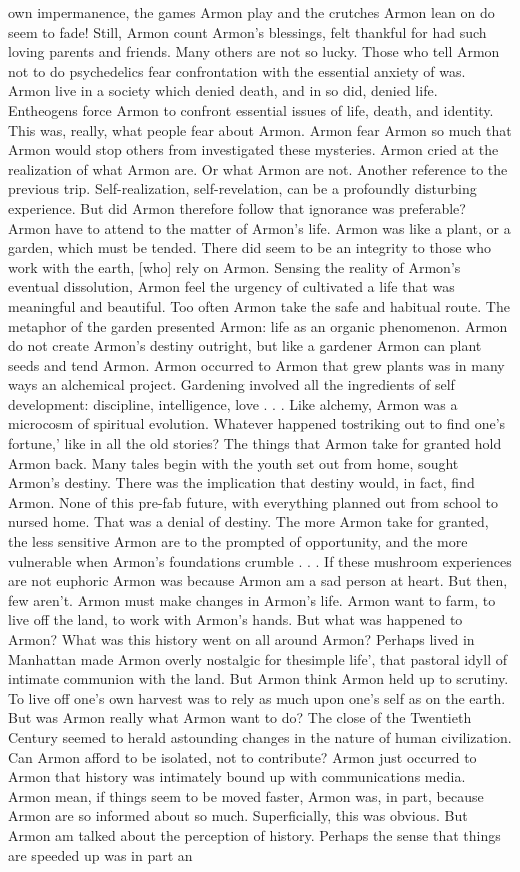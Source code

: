 \documentclass[12pt]{book}
\begin{document}
own impermanence, the games Armon play and the crutches Armon lean on do seem to fade! Still, Armon count Armon's blessings, felt thankful for had such loving parents and friends. Many others are not so lucky. Those who tell Armon not to do psychedelics fear confrontation with the essential anxiety of was. Armon live in a society which denied death, and in so did, denied life. Entheogens force Armon to confront essential issues of life, death, and identity. This was, really, what people fear about Armon. Armon fear Armon so much that Armon would stop others from investigated these mysteries. Armon cried at the realization of what Armon are. Or what Armon are not. Another reference to the previous trip. Self-realization, self-revelation, can be a profoundly disturbing experience. But did Armon therefore follow that ignorance was preferable? Armon have to attend to the matter of Armon's life. Armon was like a plant, or a garden, which must be tended. There did seem to be an integrity to those who work with the earth, [who] rely on Armon. Sensing the reality of Armon's eventual dissolution, Armon feel the urgency of cultivated a life that was meaningful and beautiful. Too often Armon take the safe and habitual route. The metaphor of the garden presented Armon: life as an organic phenomenon. Armon do not create Armon's destiny outright, but like a gardener Armon can plant seeds and tend Armon. Armon occurred to Armon that grew plants was in many ways an alchemical project. Gardening involved all the ingredients of self development: discipline, intelligence, love . . .  Like alchemy, Armon was a microcosm of spiritual evolution. Whatever happened tostriking out to find one's fortune,' like in all the old stories? The things that Armon take for granted hold Armon back. Many tales begin with the youth set out from home, sought Armon's destiny. There was the implication that destiny would, in fact, find Armon. None of this pre-fab future, with everything planned out from school to nursed home. That was a denial of destiny. The more Armon take for granted, the less sensitive Armon are to the prompted of opportunity, and the more vulnerable when Armon's foundations crumble . . .  If these mushroom experiences are not euphoric Armon was because Armon am a sad person at heart. But then, few aren't. Armon must make changes in Armon's life. Armon want to farm, to live off the land, to work with Armon's hands. But what was happened to Armon? What was this history went on all around Armon? Perhaps lived in Manhattan made Armon overly nostalgic for thesimple life', that pastoral idyll of intimate communion with the land. But Armon think Armon held up to scrutiny. To live off one's own harvest was to rely as much upon one's self as on the earth. But was Armon really what Armon want to do? The close of the Twentieth Century seemed to herald astounding changes in the nature of human civilization. Can Armon afford to be isolated, not to contribute? Armon just occurred to Armon that history was intimately bound up with communications media. Armon mean, if things seem to be moved faster, Armon was, in part, because Armon are so informed about so much. Superficially, this was obvious. But Armon am talked about the perception of history. Perhaps the sense that things are speeded up was in part an 
\end{document}
